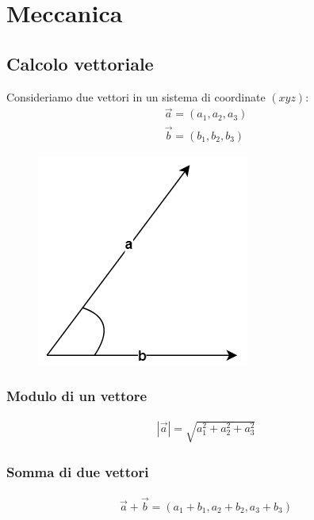 \chapter{Meccanica}

\section{Calcolo vettoriale}
Consideriamo due vettori in un sistema di coordinate $(xyz)$:
\begin{displaymath}\begin{aligned}
	\vec{a} = (a_1, a_2, a_3)\\
    \vec{b} = (b_1, b_2, b_3)    
\end{aligned}\end{displaymath}
\begin{figure}[h!]
       	\centering
        \includegraphics[scale = 0.4]{Pictures/vettori.png}
    \end{figure}
    
\subsection{Modulo di un vettore}
\begin{displaymath}\begin{aligned}
	|\vec{a}| = \sqrt{a_1^2 + a_2^2 + a_3^2}
\end{aligned}\end{displaymath}

\subsection{Somma di due vettori}
\begin{displaymath}\begin{aligned}
	\vec{a} + \vec{b} = (a_1 + b_1, a_2 + b_2, a_3 + b_3)
\end{aligned}\end{displaymath}

